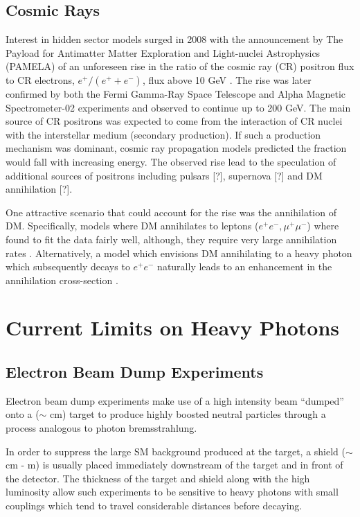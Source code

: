 \subsection{Cosmic Rays}

Interest in hidden sector models surged in 2008 with the announcement by 
The Payload for Antimatter Matter Exploration and Light-nuclei Astrophysics 
(PAMELA) of an unforeseen rise in the ratio of the cosmic ray (CR) positron flux
to CR electrons, $e^{+}/(e^{+} + e^{-})$, flux above 10 GeV \cite{pamela2008}.
The rise was later confirmed by both the 
Fermi Gamma-Ray Space Telescope \cite{Ackermann2012} and Alpha Magnetic 
Spectrometer-02 \cite{Aguilar2013} experiments and observed to continue
up to 200 GeV. The main source of CR positrons 
was expected to come from the interaction of CR nuclei with the interstellar 
medium (secondary production).  If such a production mechanism was dominant, 
cosmic ray propagation models predicted the fraction would fall with increasing
energy.  The observed rise lead to the speculation of additional sources of 
positrons including pulsars [?], supernova [?] and DM annihilation [?].

One attractive scenario that could account for the rise was the annihilation of
DM.  Specifically, models where DM annihilates to leptons ($e^+e^-, \mu^+\mu^-$)
where found to fit the data fairly well, although, they
require very large annihilation rates \cite{Cholis2009}. Alternatively, a model
which envisions DM annihilating to a heavy photon which subsequently decays to 
$e^+e^-$ naturally leads to an enhancement in the 
annihilation cross-section \cite{Arkani-Hamed2009}.

\section{Current Limits on Heavy Photons}

\subsection{Electron Beam Dump Experiments}

Electron beam dump experiments make use of a high intensity beam ``dumped'' onto
a ($\sim$ cm) target to produce highly boosted neutral particles through a 
process analogous to photon bremsstrahlung.  

In order to suppress the 
large SM background produced at the target, a shield ($\sim$ cm - m) is usually
placed immediately downstream of the target and in front of the detector.  The
thickness of the target and shield along with the high luminosity allow such 
experiments to be sensitive to heavy photons with small couplings which tend to
travel considerable distances before decaying.  

